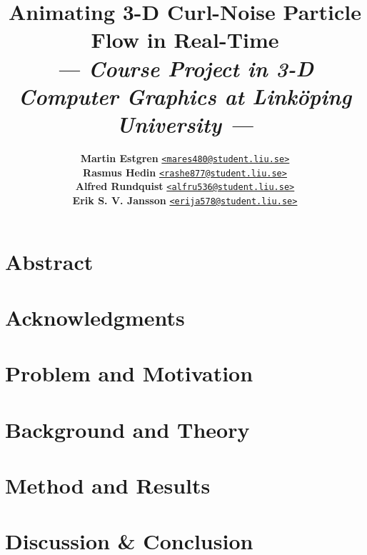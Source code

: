 \documentclass[a4paper, twocolumn]{article}
\title{\textbf{Animating 3-D Curl-Noise Particle Flow in Real-Time}\\
       \Large{\textit{--- Course Project in 3-D Computer Graphics at Linköping University ---}}}
\author{{\textbf{Martin Estgren}}\;\;\;\;\;\; {\href{mailto:mares480@student.liu.se}{\texttt{<mares480@student.liu.se>}}}\\
        {\textbf{Rasmus Hedin}}\;\;\;\;\;\;\;\; {\href{mailto:rashe877@student.liu.se}{\texttt{<rashe877@student.liu.se>}}}\\
        {\textbf{Alfred Rundquist}}\;\;\; {\href{mailto:alfru536@student.liu.se}{\texttt{<alfru536@student.liu.se>}}}\\
        {\textbf{Erik S. V. Jansson}}\; {\href{mailto:erija578@student.liu.se}{\texttt{<erija578@student.liu.se>}}}}
\begin{document}
    \maketitle
    \section*{Abstract}


    \tableofcontents \newpage

    \section*{Acknowledgments}


    \nocite{*} %
    
    
    \clearpage %

    \section{Problem and Motivation} \label{sec:problem_and_motivation}


    \section{Background and Theory} \label{sec:background_and_theory}


    \section{Method and Results} \label{sec:method_and_results}


    \section{Discussion \& Conclusion} \label{sec:discussion_and_conclusion}

\end{document}
